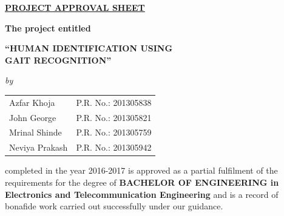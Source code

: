 \begin{center}
%
\underline{\bfseries \huge PROJECT APPROVAL SHEET}\\
\vspace{0.4cm}
\begin{figure}[H]
{\centering {}\par}
\end{figure}
\vspace{-0.5cm}
{\bfseries The project entitled}\\
\vspace{0.3cm}
\begin{large}
{\bfseries ``HUMAN IDENTIFICATION USING \\GAIT RECOGNITION''}\\
\end{large}
\vspace{0.2cm}
\begin{small}
\emph{by}\\
\end{small}
\vspace{0.2cm}
\begin{table}[H]
\normalsize
\bfseries
\begin{center}
\begin{tabular}{ll}
Azfar Khoja \hspace{1cm} & P.R. No.: 201305838\\
John George & P.R. No.: 201305821\\
Mrinal Shinde & P.R. No.: 201305759\\
Neviya Prakash & P.R. No.: 201305942\\
\end{tabular}
\end{center}
\end{table}
\vspace{-1.2cm}
\end{center}
\noindent completed in the year 2016-2017 is approved as a partial fulfilment of the requirements for the degree of {\bfseries BACHELOR OF ENGINEERING in Electronics and Telecommunication Engineering} and is a record of bonafide work carried out successfully under our guidance.\\




